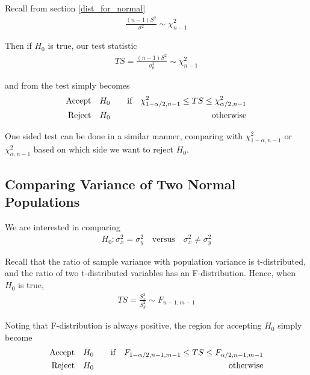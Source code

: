 \documentclass[../probability-notes.tex]{subfiles}
\begin{document}
    Recall from section \ref{dist_for_normal}
    \begin{align*}
        \frac{(n-1)S^{2}}{\sigma^{2}} \sim \chi_{n-1}^{2}
    \end{align*}

    Then if $H_{0}$ is true, our test statistic
    \begin{align*}
        TS = \frac{(n-1)S^{2}}{\sigma_{0}^{2}} \sim \chi_{n-1}^{2}
    \end{align*}

    and from the test simply becomes
    \begin{alignat*}{2}
        \text{Accept\quad} &H_{0} \quad &\text{if} \quad \chi_{1-\alpha/2, n-1}^{2} \leq TS \leq \chi_{\alpha/2, n-1}^{2}\\
        \text{Reject\quad} &H_{0} \quad &\text{otherwise}
    \end{alignat*}

    One sided test can be done in a similar manner, comparing with $\chi_{1-\alpha, n-1}^{2}$ or $\chi_{\alpha, n-1}^{2}$ based on which side we want to reject $H_{0}$.\newline

    \subsection{Comparing Variance of Two Normal Populations}
    We are interested in comparing
    \begin{align*}
        H_{0}: \sigma_{x}^{2} = \sigma_{y}^{2} \quad \text{versus} \quad \sigma_{x}^{2} \neq \sigma_{y}^{2}
    \end{align*}

    Recall that the ratio of sample variance with population variance is t-distributed, and the ratio of two t-distributed variables has an F-distribution. Hence, when $H_{0}$ is true,
    \begin{align*}
        TS = \frac{S_{x}^{2}}{S_{y}^{2}} \sim F_{n-1, m-1}
    \end{align*}

    Noting that F-distribution is always positive, the region for accepting $H_{0}$ simply become
    \begin{alignat*}{2}
        \text{Accept\quad} &H_{0} &\text{\quad if} \quad F_{1-\alpha/2, n-1, m-1} \leq TS \leq F_{\alpha/2, n-1, m-1}\\
        \text{Reject\quad} &H_{0} &\text{\quad otherwise}
    \end{alignat*}
\end{document}
